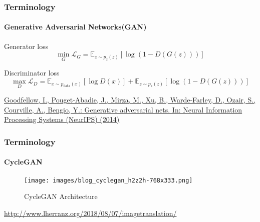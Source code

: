 \documentclass[aspectratio=169, lecture, amberg]{OTHAWbeamer}
\begin{document}
\begin{frame}
    \frametitle{Terminology}
    \framesubtitle{Generative Adversarial Networks(GAN)}
    \begin{block}{Generator loss}
        \begin{equation}
            \min_G \mathcal{L}_G = \mathbb{E}_{z \sim p_z(z)} [\log(1 - D(G(z)))]
        \end{equation}
    \end{block}
    \begin{block}{Discriminator loss}
        \begin{equation}
            \max_D \mathcal{L}_D = \mathbb{E}_{x \sim p_{\text{data}}(x)} [\log D(x)] + \mathbb{E}_{z \sim p_z(z)} [\log(1 - D(G(z)))]
        \end{equation}
    \end{block}
    \tiny\footnotemark \url{Goodfellow, I., Pouget-Abadie, J., Mirza, M., Xu, B., Warde-Farley, D., Ozair,
    S., Courville, A., Bengio, Y.: Generative adversarial nets. In: Neural Information
    Processing Systems (NeurIPS) (2014)}
\end{frame}

\begin{frame}
\frametitle{Terminology}
\framesubtitle{CycleGAN}
\begin{figure}
    \centering
    \texttt{[image: images/blog\_cyclegan\_h2z2h-768x333.png]}
    \caption{CycleGAN Architecture}
\end{figure}
\tiny{\footnotemark \url{http://www.lherranz.org/2018/08/07/imagetranslation/}}
\end{frame}
\end{document}
